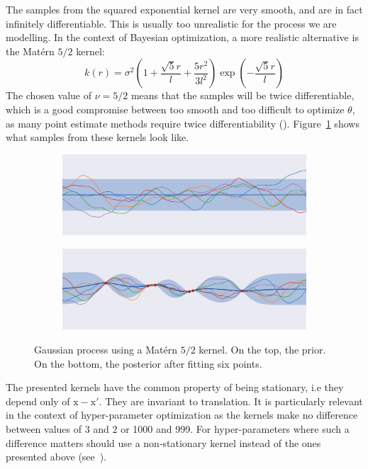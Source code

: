 The samples from the squared exponential kernel are very smooth, and are in fact infinitely differentiable. This is usually too unrealistic for the process we are modelling. In the context of Bayesian optimization, a more realistic alternative is the Matérn $5/2$ kernel:
\begin{equation}
    k(r) = \sigma^2 \left( 1 + \frac{\sqrt{5}r}{l} + \frac{5r^2}{3l^2} \right) \exp \left( - \frac{\sqrt{5}r}{l}\right)
\end{equation}
The chosen value of $\nu = 5/2$ means that the samples will be twice differentiable, which is a good compromise between too smooth and too difficult to optimize $\theta$, as many point estimate methods require twice differentiability (\textcite{snoek2012NIPS}). Figure~\ref{fig:gp_matern} shows what samples from these kernels look like.

\begin{figure}[htb]
    \centering
    \begin{subfigure}[b]{\textwidth}
        \includegraphics[width=\textwidth]{img_hyperopt/gp_matern_prior}
    \end{subfigure}

    \begin{subfigure}[b]{\textwidth}
        \includegraphics[width=\textwidth]{img_hyperopt/gp_matern_posterior}
    \end{subfigure}
    \caption{Gaussian process using a Matérn $5/2$ kernel. On the top, the prior. On the bottom, the posterior after fitting six points.}
    \label{fig:gp_matern}
\end{figure}

The presented kernels have the common property of being stationary, i.e they depend only of $\mathrm{x} - \mathrm{x'}$. They are invariant to translation. It is particularly relevant in the context of hyper-parameter optimization as the kernels make no difference between values of 3 and 2 or 1000 and 999. For hyper-parameters where such a difference matters should use a non-stationary kernel instead of the ones presented above (see~\textcite{paciorek2003NIPS}).

